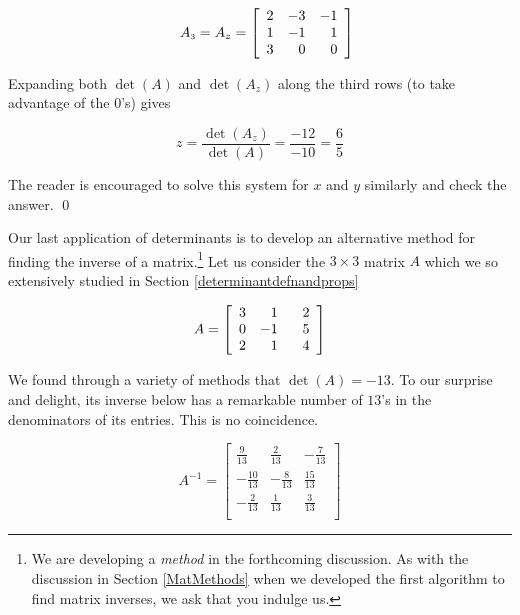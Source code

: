 \begin{ex}
\begin{enumerate}
\[\begin{array}{cccc}
&

A_{\mbox{\tiny$3$}} = A_{z} =  \left[ \begin{array}{rrr} 2 & -3 & -1 \\ 1 & -1 & 1 \\ 3 & 0 & 0 \end{array} \right] \\

\end{array} \]

Expanding both $\det(A)$ and $\det\left(A_{z}\right)$ along the third rows (to take advantage of the $0$'s) gives

\[ z = \dfrac{\det\left(A_{z}\right)}{\det(A)} = \dfrac{-12}{-10} = \dfrac{6}{5} \]

The reader is encouraged to solve this system for $x$ and $y$ similarly and check the answer.  \qed

\end{enumerate}

\end{ex}

\smallskip

Our last application of determinants is to develop an alternative method for finding the inverse of a matrix.\footnote{We are developing a \textit{method} in the forthcoming discussion.  As with the discussion in Section \ref{MatMethods} when we developed the first algorithm to find matrix inverses, we ask that you indulge us.}  Let us consider the $3 \times 3$ matrix $A$ which we so extensively studied in Section \ref{determinantdefnandprops}

\[A = \left[ \begin{array}{rrr} 3 & 1 & \hphantom{-}2 \\ 0 & -1 & 5 \\ 2 & 1 & 4 \\ \end{array} \right]\]

We found through a variety of methods that $\det(A) = -13$.  To our surprise and delight, its inverse below has a remarkable number of $13$'s in the denominators of its entries. This is no coincidence.

\[ A^{-1} = \left[ \begin{array}{rrr} \frac{9}{13} & \frac{2}{13} & -\frac{7}{13} \\[3pt] -\frac{10}{13} & -\frac{8}{13} & \frac{15}{13} \\[3pt] -\frac{2}{13} & \frac{1}{13} & \frac{3}{13} \\ \end{array} \right]\]

